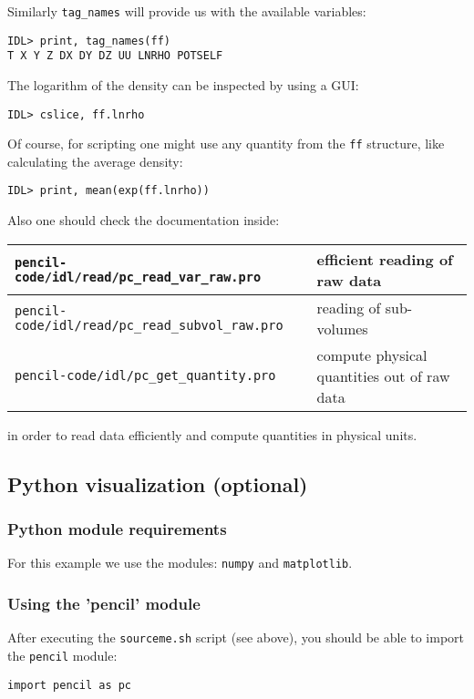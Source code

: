 \documentclass[a4paper,12pt]{article}
\begin{document}
Similarly \verb|tag_names| will provide us with the available variables:
\begin{verbatim}
IDL> print, tag_names(ff)
T X Y Z DX DY DZ UU LNRHO POTSELF
\end{verbatim}

The logarithm of the density can be inspected by using a GUI:
\begin{verbatim}
IDL> cslice, ff.lnrho
\end{verbatim}

Of course, for scripting one might use any quantity from the \verb|ff| structure, like calculating the average density:
\begin{verbatim}
IDL> print, mean(exp(ff.lnrho))
\end{verbatim}

Also one should check the documentation inside:
\begin{center}
\begin{tabular}{|l|l|}\hline
  \verb|pencil-code/idl/read/pc_read_var_raw.pro| & efficient reading of raw data\\\hline
  \verb|pencil-code/idl/read/pc_read_subvol_raw.pro| & reading of sub-volumes\\\hline
  \verb|pencil-code/idl/pc_get_quantity.pro| & compute physical quantities out of raw data\\\hline
\end{tabular}
\end{center}
in order to read data efficiently and compute quantities in physical units.


\subsection{Python visualization (optional)}
\subsubsection{Python module requirements}
For this example we use the modules: \verb|numpy| and \verb|matplotlib|.

\subsubsection{Using the 'pencil' module}
After executing the \verb|sourceme.sh| script (see above), you should be able to import the \verb|pencil| module:

\begin{verbatim}
import pencil as pc
\end{verbatim}
\end{document}
